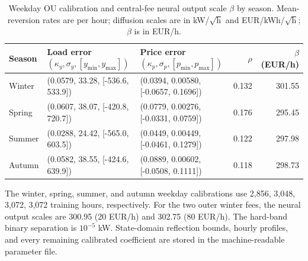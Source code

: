 \begin{table}[ht]
\centering
\scriptsize
\caption{Weekday OU calibration and central-fee neural output scale $\beta$ by season. Mean-reversion rates are per hour; diffusion scales are in kW/$\sqrt{\mathrm{h}}$ and EUR/kWh/$\sqrt{\mathrm{h}}$; $\beta$ is in EUR/h.}
\label{tab:supp-ou-parameters}
\begin{tabularx}{\linewidth}{l>{\raggedright\arraybackslash}X>{\raggedright\arraybackslash}Xrr}
\toprule
Season & Load error $(\kappa_y,\sigma_y,[y_{\min},y_{\max}])$ & Price error $(\kappa_p,\sigma_p,[p_{\min},p_{\max}])$ & $\rho$ & $\beta$ (EUR/h) \\
\midrule
Winter & (0.0579, 33.28, [-536.6, 533.9]) & (0.0394, 0.00580, [-0.0657, 0.1696]) & 0.132 & 301.55 \\
Spring & (0.0607, 38.07, [-420.8, 720.7]) & (0.0779, 0.00276, [-0.0331, 0.0759]) & 0.176 & 295.45 \\
Summer & (0.0288, 24.42, [-565.0, 603.5]) & (0.0449, 0.00449, [-0.0461, 0.1279]) & 0.122 & 297.98 \\
Autumn & (0.0582, 38.55, [-424.6, 639.9]) & (0.0889, 0.00602, [-0.0508, 0.1111]) & 0.118 & 298.73 \\
\bottomrule
\end{tabularx}
\end{table}

The winter, spring, summer, and autumn weekday calibrations use 2,856, 3,048, 3,072, 3,072 training hours, respectively. 
For the two outer winter fees, the neural output scales are 300.95 (20 EUR/h) and 302.75 (80 EUR/h). The hard-band binary separation is $10^{-5}$ kW. State-domain reflection bounds, hourly profiles, and every remaining calibrated coefficient are stored in the machine-readable parameter file.
